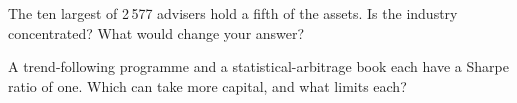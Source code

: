 \begin{interviewq}\label{iq:in:quantitative-hedge-funds-and-systematic-managers:5}
The ten largest of 2\,577 advisers hold a fifth of the assets. Is the industry concentrated? What would change your
answer?
\end{interviewq}

\begin{interviewq}\label{iq:in:quantitative-hedge-funds-and-systematic-managers:6}
A trend-following programme and a statistical-arbitrage book each have a Sharpe ratio of one. Which can take more
capital, and what limits each?
\end{interviewq}
